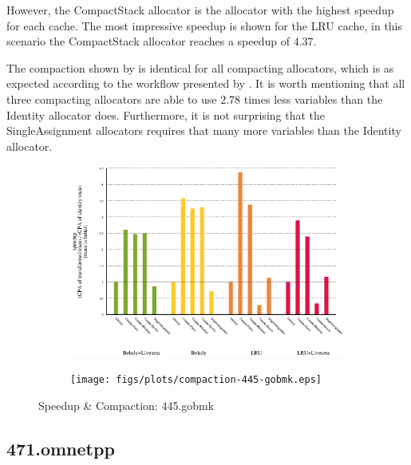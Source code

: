 \documentclass[onecolumn, openright, master, english, signatures]{dbrgrptt}
\begin{document}
However, the CompactStack allocator is the allocator with the highest speedup for each cache.
The most impressive speedup is shown for the \ac{LRU} cache, in this scenario the CompactStack allocator reaches a speedup of $4.37$.

The compaction shown by  is identical for all compacting allocators, which is as expected according to the workflow presented by .
It is worth mentioning that all three compacting allocators are able to use $2.78$ times less variables than the Identity allocator does.
Furthermore, it is not surprising that the SingleAssignment allocators requires that many more variables than the Identity allocator.

\begin{figure}[!ht]
  \centering
  \begin{subfigure}[b]{0.5\textwidth}%
    \includegraphics[width=\textwidth]{figs/plots/speedup-445-gobmk.eps}
  \label{fig:speedup-compaction-445-gobmk-speedup}
  \end{subfigure}%
    \begin{subfigure}[b]{0.5\textwidth}%
    \texttt{[image: figs/plots/compaction-445-gobmk.eps]}
  \label{fig:speedup-compaction-445-gobmk-compaction}
  \end{subfigure}%
  \caption{Speedup \& Compaction: 445.gobmk}
  \label{fig:speedup-compaction-445-gobmk}
\end{figure}

\subsection{471.omnetpp}
\end{document}
